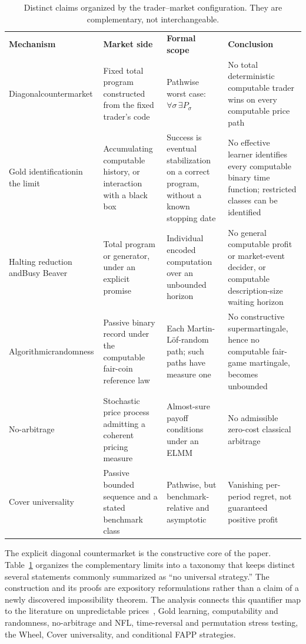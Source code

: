 \documentclass[aps,pra,reprint,superscriptaddress,amsmath,amssymb,floatfix]{revtex4-2}
\theoremstyle{plain}
\theoremstyle{definition}
\theoremstyle{remark}
\begin{document}
\begin{table}[t]
\caption{\label{tab:claimmap}Distinct claims organized by the trader--market
configuration. They are complementary, not interchangeable.}
\centering
\begin{ruledtabular}
\begin{tabular}{p{}p{}p{}p{}}
\textbf{Mechanism} & \textbf{Market side} & \textbf{Formal scope}
& \textbf{Conclusion} \\
\colrule
Diagonal\newline\mbox{countermarket}
& Fixed total program constructed from the fixed trader's code
& Pathwise worst case:
\(\forall\sigma\,\exists P_\sigma\)
& No total deterministic computable trader wins on every computable price path \\
Gold identification\newline in the limit
& Accumulating computable history, or interaction with a black box
& Success is eventual stabilization on a correct program, without a known
stopping date
& No effective learner identifies every computable binary time function;
restricted classes can be identified \\
Halting reduction and\newline Busy Beaver
& Total program or generator, under an explicit promise
& Individual encoded computation over an unbounded horizon
& No general computable profit or market-event decider, or computable
description-size waiting horizon \\
Algorithmic\newline randomness
& Passive binary record under the computable fair-coin reference law
& Each Martin-L\"of-random path; such paths have measure one
& No constructive supermartingale, hence no computable fair-game martingale,
becomes unbounded \\
No-arbitrage
& Stochastic price process admitting a coherent pricing measure
& Almost-sure payoff conditions under an ELMM
& No admissible zero-cost classical arbitrage \\
Cover universality
& Passive bounded sequence and a stated benchmark class
& Pathwise, but benchmark-relative and asymptotic
& Vanishing per-period regret, not guaranteed positive profit \\
\end{tabular}
\end{ruledtabular}
\end{table}

The explicit diagonal countermarket is the constructive core of the paper.
Table~\ref{tab:claimmap} organizes the complementary limits into a taxonomy that
keeps distinct several statements commonly summarized as ``no universal
strategy.'' The construction and its proofs are expository reformulations
rather than a claim of a newly discovered impossibility theorem.
The analysis connects this quantifier map to the literature on unpredictable
prices~\cite{Bachelier1900,Samuelson1965,Fama1970}, Gold learning, computability
and randomness, no-arbitrage and NFL, time-reversal and permutation stress
testing, the Wheel, Cover universality, and conditional FAPP strategies.
\end{document}
